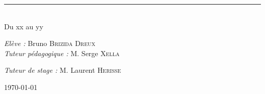 \begin{titlepage}
\begin{center}
\hrule  ~\\[1.5cm]
\large Du xx au yy

\vspace{4cm}
\large\emph{Elève :} Bruno \textsc{Brizida Dreux} ~\\
\vspace{0.5cm}
\large\emph{Tuteur pédagogique :} M. Serge \textsc{Xella}

\large\emph{Tuteur de stage :} M. Laurent \textsc{Herisse}




\vfill

{\large\today}

\end{center}

\end{titlepage}
